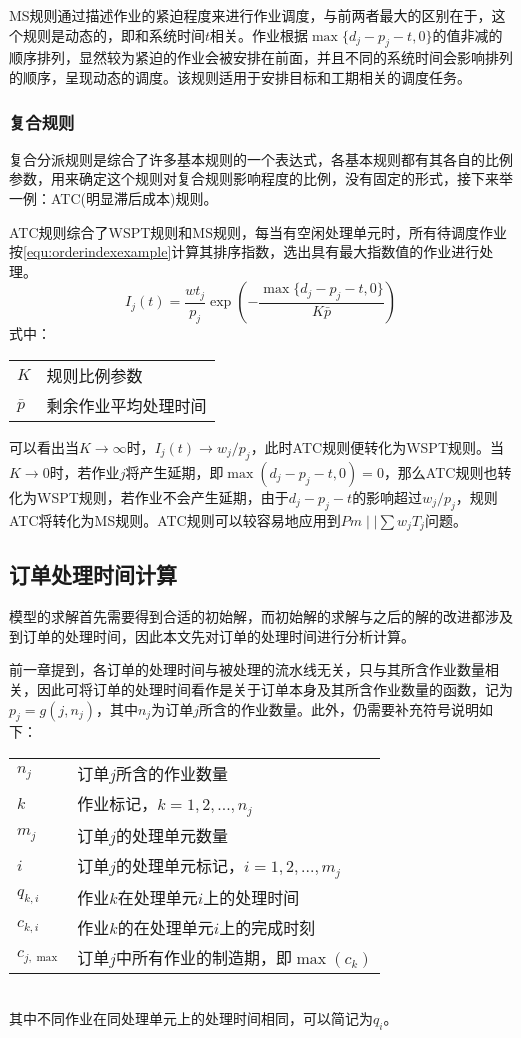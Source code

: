 MS规则通过描述作业的紧迫程度来进行作业调度，与前两者最大的区别在于，这个规则是动态的，即和系统时间$t$相关。作业根据$\max \{d_j - p_j - t , 0\}$的值非减的顺序排列，显然较为紧迫的作业会被安排在前面，并且不同的系统时间会影响排列的顺序，呈现动态的调度。该规则适用于安排目标和工期相关的调度任务。
\subsubsection{复合规则}
复合分派规则是综合了许多基本规则的一个表达式，各基本规则都有其各自的比例参数，用来确定这个规则对复合规则影响程度的比例，没有固定的形式，接下来举一例：ATC(明显滞后成本)规则。

ATC规则综合了WSPT规则和MS规则，每当有空闲处理单元时，所有待调度作业按\eqref{equ:orderindexexample}计算其排序指数，选出具有最大指数值的作业进行处理。
\begin{equation}
I_j(t) = \frac{wt_j}{p_j}\exp\left(-\frac{\max\{d_j - p_j - t, 0\}}{K\bar p}\right) \label{equ:orderindexexample}
\end{equation}
式中：

\begin{tabular}{ll}
$K$ & 规则比例参数\\
$\bar p$ &剩余作业平均处理时间
\end{tabular}

可以看出当$K \to \infty$时，$I_j(t) \to w_j/p_j$，此时ATC规则便转化为WSPT规则。当$K \to 0$时，若作业$j$将产生延期，即$\max(d_j - p_j -t , 0 ) = 0$，那么ATC规则也转化为WSPT规则，若作业不会产生延期，由于$d_j - p_j - t$的影响超过$w_j/p_j$，规则ATC将转化为MS规则。ATC规则可以较容易地应用到$Pm\mid\mid \sum w_jT_j$问题。

\subsection{订单处理时间计算}
模型的求解首先需要得到合适的初始解，而初始解的求解与之后的解的改进都涉及到订单的处理时间，因此本文先对订单的处理时间进行分析计算。

前一章提到，各订单的处理时间与被处理的流水线无关，只与其所含作业数量相关，因此可将订单的处理时间看作是关于订单本身及其所含作业数量的函数，记为$p_j = g(j,n_j)$，其中$n_j$为订单$j$所含的作业数量。此外，仍需要补充符号说明如下：\\[3pt]
\begin{supertabular}{ll}
$n_j$ & 订单$j$所含的作业数量\\
$k$ & 作业标记，$k = 1,2,...,n_j$\\
$m_j$ & 订单$j$的处理单元数量\\
$i$ & 订单$j$的处理单元标记，$i = 1,2,...,m_j$\\
$q_{k,i}$ & 作业$k$在处理单元$i$上的处理时间\\
$c_{k,i}$ &作业$k$的在处理单元$i$上的完成时刻\\
$c_{j,\max}$ & 订单$j$中所有作业的制造期，即$\max(c_k)$\\
\end{supertabular}\\[3pt]
其中不同作业在同处理单元上的处理时间相同，可以简记为$q_i$。

